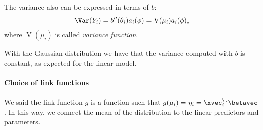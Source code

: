 The variance also can be expressed in terms of $b$:
\begin{equation}
    \Var(Y_i) = b''(\theta_i)a_i(\phi) = \operatorname{V}(\mu_i)a_i(\phi),
\end{equation}
where $\operatorname{V}(\mu_i)$ is called \emph{variance function}.

\begin{example}
    With the Gaussian distribution we have that the variance computed with $b$ is constant, as expected for the linear model.
\end{example}

\paragraph{Choice of link functions}

We said the link function $g$ is a function such that $g(\mu_i) = \eta_i = \xvec_i^\t\betavec$. In this way, we connect the mean of the distribution to the linear predictors and parameters.

